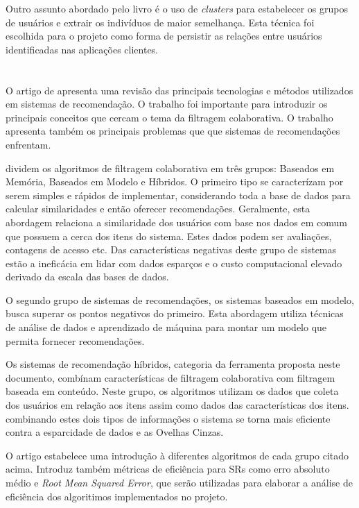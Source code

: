 \documentclass[
	12pt,				%
    oneside,			%
	a4paper,			%
	english,			%
	french,				%
	spanish,			%
	brazil,				%
	]{abntex2}
\begin{document}
Outro assunto abordado pelo livro é o uso de \textit{clusters} para estabelecer os grupos de usuários e extrair os indivíduos de maior semelhança. Esta técnica 
foi escolhida para o projeto como forma de persistir as relações entre usuários identificadas nas aplicações clientes.

\section{}
O artigo de  apresenta uma revisão das principais tecnologias e métodos utilizados em sistemas de recomendação. O trabalho foi
importante para introduzir os principais conceitos que cercam o tema da filtragem colaborativa. O trabalho apresenta também os principais problemas que 
que sistemas de recomendações enfrentam.

 dividem os algoritmos de filtragem colaborativa em três grupos: Baseados em Memória, Baseados em Modelo e Híbridos. O primeiro 
tipo se caracterízam por serem simples e rápidos de implementar, considerando toda a base de dados para calcular similaridades e então oferecer recomendações.
Geralmente, esta abordagem relaciona a similaridade dos usuários com base nos dados em comum que possuem a cerca dos itens do sistema. Estes dados podem ser
avaliações, contagens de acesso etc. Das características negativas deste grupo de sistemas estão a ineficácia em lidar com dados esparços e o custo computacional
elevado derivado da escala das bases de dados. 

O segundo grupo de sistemas de recomendações, os sistemas baseados em modelo, busca superar os pontos negativos do primeiro. Esta abordagem utiliza técnicas de
análise de dados e aprendizado de máquina para montar um modelo que permita fornecer recomendações. 

Os sistemas de recomendação híbridos, categoria da ferramenta proposta neste documento, combínam características de filtragem colaborativa com filtragem baseada
em conteúdo. Neste grupo, os algoritmos utilizam os dados que coleta dos usuários em relação aos itens assim como dados das características dos itens.
combinando estes dois tipos de informações o sistema se torna mais eficiente contra a esparcidade de dados e as Ovelhas Cinzas.

O artigo estabelece uma introdução à diferentes algoritmos de cada grupo citado acima. Introduz também métricas de eficiência para SRs como
erro absoluto médio e \textit{Root Mean Squared Error}, que serão utilizadas para elaborar a análise de eficiência dos algoritimos implementados no projeto.
\end{document}
